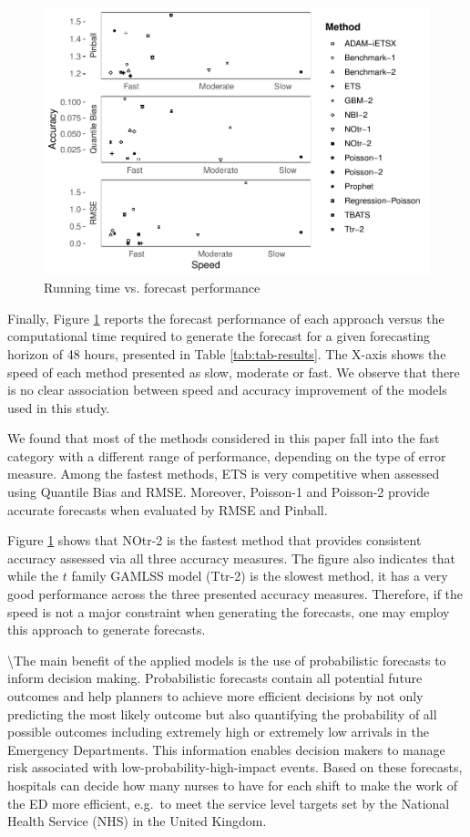 \documentclass[]{elsarticle} %
\begin{document}
\begin{figure}[H]

{\centering \includegraphics[width=0.7\linewidth]{paper_files/figure-latex/time-accuracy-1} 

}

\caption{Running time vs. forecast performance}\label{fig:time-accuracy}
\end{figure}

Finally, Figure \ref{fig:time-accuracy} reports the forecast
performance of each approach versus the computational time required to
generate the forecast for a given forecasting horizon of 48 hours,
presented in Table \ref{tab:tab-results}. The X-axis shows the speed of
each method presented as slow, moderate or fast. We observe that there
is no clear association between speed and accuracy improvement of the
models used in this study.

We found that most of the methods considered in this paper fall into the
fast category with a different range of performance, depending on the
type of error measure. Among the fastest methods, ETS is very
competitive when assessed using Quantile Bias and RMSE. Moreover,
Poisson-1 and Poisson-2 provide accurate forecasts when evaluated by
RMSE and Pinball.

Figure \ref{fig:time-accuracy} shows that NOtr-2 is the fastest method
that provides consistent accuracy assessed via all three accuracy
measures. The figure also indicates that while the \(t\) family GAMLSS
model (Ttr-2) is the slowest method, it has a very good performance
across the three presented accuracy measures. Therefore, if the speed is
not a major constraint when generating the forecasts, one may employ
this approach to generate forecasts.

\textbackslash The main benefit of the applied models is the use of probabilistic forecasts to inform decision making. Probabilistic forecasts contain all potential future outcomes and help planners to
achieve more efficient decisions by not only predicting the most likely outcome but also
quantifying the probability of all possible outcomes including extremely high or extremely
low arrivals in the Emergency Departments. This information enables decision makers to
manage risk associated with low-probability-high-impact events. Based on these forecasts,
hospitals can decide how many nurses to have for each shift to make the work of the ED more
efficient, e.g.~to meet the service level targets set by the National Health Service (NHS) in
the United Kingdom.
\end{document}
